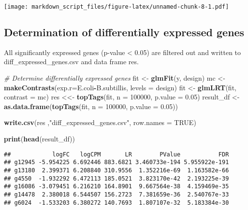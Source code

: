 \documentclass[]{article}
\newenvironment{Shaded}{\begin{snugshade}}{\end{snugshade}}
\newcommand{\KeywordTok}[1]{\textcolor[rgb]{0.13,0.29,0.53}{\textbf{#1}}}
\newcommand{\DataTypeTok}[1]{\textcolor[rgb]{0.13,0.29,0.53}{#1}}
\newcommand{\DecValTok}[1]{\textcolor[rgb]{0.00,0.00,0.81}{#1}}
\newcommand{\FloatTok}[1]{\textcolor[rgb]{0.00,0.00,0.81}{#1}}
\newcommand{\StringTok}[1]{\textcolor[rgb]{0.31,0.60,0.02}{#1}}
\newcommand{\CommentTok}[1]{\textcolor[rgb]{0.56,0.35,0.01}{\textit{#1}}}
\newcommand{\OtherTok}[1]{\textcolor[rgb]{0.56,0.35,0.01}{#1}}
\newcommand{\OperatorTok}[1]{\textcolor[rgb]{0.81,0.36,0.00}{\textbf{#1}}}
\newcommand{\NormalTok}[1]{#1}
\begin{document}
\texttt{[image: markdown\_script\_files/figure-latex/unnamed-chunk-8-1.pdf]}

\subsection{Determination of differentially expressed
genes}\label{determination-of-differentially-expressed-genes}

All significantly expressed genes (p-value \textless{} 0.05) are
filtered out and written to diff\_expressed\_genes.csv and data frame
res.

\begin{Shaded}
\begin{Highlighting}[]
\CommentTok{# Determine differentially expressed genes}
\NormalTok{fit <-}\StringTok{ }\KeywordTok{glmFit}\NormalTok{(y, design)}
\NormalTok{mc  <-}\StringTok{ }\KeywordTok{makeContrasts}\NormalTok{(}\DataTypeTok{exp.r=}\NormalTok{E.coli}\OperatorTok{-}\NormalTok{B.subtillis, }\DataTypeTok{levels =}\NormalTok{ design)}
\NormalTok{fit <-}\StringTok{ }\KeywordTok{glmLRT}\NormalTok{(fit, }\DataTypeTok{contrast =}\NormalTok{ mc)}
\NormalTok{res <<-}\StringTok{ }\KeywordTok{topTags}\NormalTok{(fit, }\DataTypeTok{n =} \DecValTok{100000}\NormalTok{, }\DataTypeTok{p.value =} \FloatTok{0.05}\NormalTok{)}
\NormalTok{result_df <-}\StringTok{ }\KeywordTok{as.data.frame}\NormalTok{(}\KeywordTok{topTags}\NormalTok{(fit, }\DataTypeTok{n =} \DecValTok{100000}\NormalTok{, }\DataTypeTok{p.value =} \FloatTok{0.05}\NormalTok{))}
  
\KeywordTok{write.csv}\NormalTok{(res ,}\StringTok{"diff_expressed_genes.csv"}\NormalTok{, }\DataTypeTok{row.names =} \OtherTok{TRUE}\NormalTok{)}

\KeywordTok{print}\NormalTok{(}\KeywordTok{head}\NormalTok{(result_df))}
\end{Highlighting}
\end{Shaded}

\begin{verbatim}
##            logFC   logCPM       LR        PValue           FDR
## g12945 -5.954225 6.692446 883.6821 3.460733e-194 5.955922e-191
## g13180  2.399371 6.208840 310.9556  1.352216e-69  1.163582e-66
## g4550  -1.932292 6.472113 185.0521  3.823170e-42  2.193225e-39
## g16086 -3.079451 6.216210 164.8901  9.667564e-38  4.159469e-35
## g14478  2.380018 6.544507 156.2723  7.381659e-36  2.540767e-33
## g6024  -1.533203 6.380272 140.7693  1.807107e-32  5.183384e-30
\end{verbatim}
\end{document}
